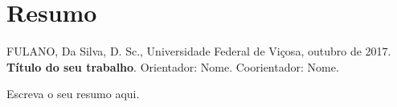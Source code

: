 \clearpage
\pagestyle{fancy}
\fancyhead{}
\fancyhead[RO,LE]{\thepage}
\fancyfoot{}
\fancyfoot[LE,RO]{}
\fancyfoot[LO,CE]{}
\fancyfoot[CO,RE]{}
\vspace*{0.7cm}
\section*{\hfill Resumo}
\vspace{1cm}

\singlespacing %

\noindent FULANO, Da Silva, D. Sc., Universidade Federal de Viçosa, outubro de 2017. \textbf{Título do seu trabalho}. Orientador: Nome. Coorientador: Nome.

\bigskip

{\onehalfspacing %
\noindent Escreva o seu resumo aqui. \lipsum[1-2]
}

